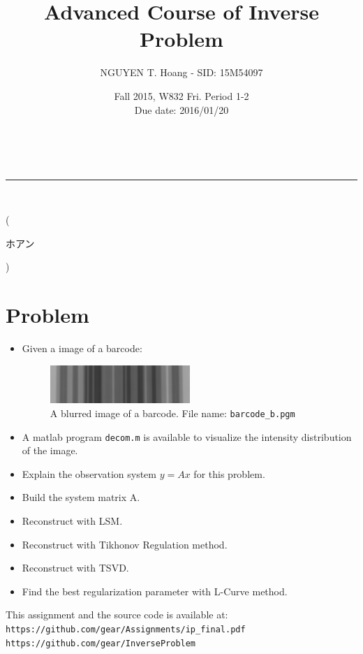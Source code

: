 \documentclass[a4paper,12pt]{article}
\makeatletter
\newcommand{\linia}{\rule{\linewidth}{0.5pt}}
\renewcommand{\maketitle} {
\begin{center}
\vspace{2ex}
{\LARGE \textsc{\@title}}
\vspace{1ex}
\\
\linia\\
\@author \hfill \@date
\vspace{4ex}
\end{center}
}
\makeatother
\begin{document}
\title{Advanced Course of Inverse Problem}

\author{NGUYEN T. Hoang - SID: 15M54097}

\date{Fall 2015, W832 Fri. Period 1-2 \\ \hfill Due date: 2016/01/20}

\maketitle
\vspace{-4.5em}
\hspace{5.3em} (\begin{CJK}{UTF8}{min}ホアン\end{CJK})
\vspace{4em}
\section*{Problem}
\begin{itemize}
	\item Given a image of a barcode:
	\begin{figure}[h]
		\centering
		\includegraphics[width=0.5\textwidth]{barcode_b.jpg}
		\caption{A blurred image of a barcode. File name: \texttt{barcode\_b.pgm}}
		\label{fig:blurbar}
	\end{figure}
    \item A matlab program \texttt{decom.m} is available to visualize the intensity distribution of the image.
	\item Explain the observation system $y=Ax$ for this problem.
	\item Build the system matrix A.
	\item Reconstruct with LSM.
	\item Reconstruct with Tikhonov Regulation method.
	\item Reconstruct with TSVD.
	\item Find the best regularization parameter with L-Curve method. 
\end{itemize}

\vspace{2em}
\noindent
This assignment and the source code is available at: \\
\texttt{https://github.com/gear/Assignments/ip\_final.pdf} \\
\texttt{https://github.com/gear/InverseProblem}
\vspace{4em}
\pagebreak
\end{document}
